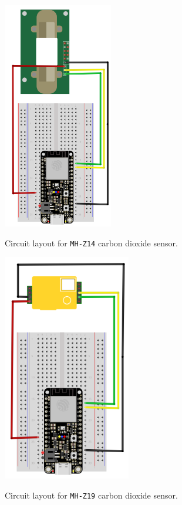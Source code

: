 \begin{marginfigure}
	\begin{center}
		\includegraphics[height=10cm]{Images/mh-z14.png}
		\caption[MHZ14]{Circuit layout for \texttt{MH-Z14} carbon dioxide sensor.}
	\end{center}
\end{marginfigure}

\begin{marginfigure}
	\begin{center}
		\includegraphics[height=10cm]{Images/mh-z19.png}
		\caption[MHZ19]{Circuit layout for \texttt{MH-Z19} carbon dioxide sensor.}
	\end{center}
\end{marginfigure}

